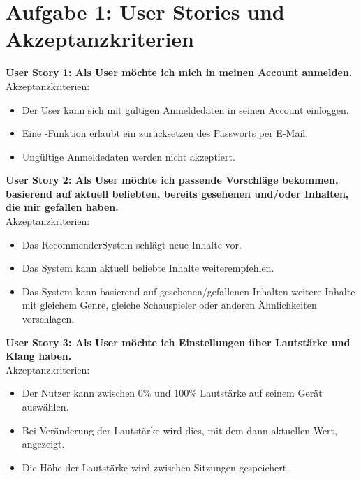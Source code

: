 \section*{Aufgabe 1: User Stories und Akzeptanzkriterien}

\textbf{User Story 1: Als User möchte ich mich in meinen Account anmelden.}\\
Akzeptanzkriterien:
\begin{itemize}
\item Der User kann sich mit gültigen Anmeldedaten in seinen Account einloggen.
\item Eine -Funktion erlaubt ein zurücksetzen des Passworts per E-Mail.
\item Ungültige Anmeldedaten werden nicht akzeptiert.
\end{itemize}
\textbf{User Story 2: Als User möchte ich passende Vorschläge bekommen, basierend auf aktuell beliebten, bereits gesehenen und/oder Inhalten, die mir gefallen haben.}\\
Akzeptanzkriterien:
\begin{itemize}
\item Das RecommenderSystem schlägt neue Inhalte vor.
\item Das System kann aktuell beliebte Inhalte weiterempfehlen.
\item Das System kann basierend auf gesehenen/gefallenen Inhalten weitere Inhalte mit gleichem Genre, gleiche Schauspieler oder anderen Ähnlichkeiten vorschlagen.
\end{itemize}
\textbf{User Story 3: Als User möchte ich Einstellungen über Lautstärke und Klang haben.}\\
Akzeptanzkriterien:
\begin{itemize}
\item Der Nutzer kann zwischen 0\% und 100\% Lautstärke auf seinem Gerät auswählen.
\item Bei Veränderung der Lautstärke wird dies, mit dem dann aktuellen Wert, angezeigt.
\item Die Höhe der Lautstärke wird zwischen Sitzungen gespeichert.
\end{itemize}
